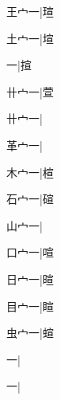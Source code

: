 \begin{multicols}{2}
{{\cjk{}王{宀}一}|{\cjk{}瑄}\par
{\cjk{}土{宀}一}|{\cjk{}塇}\par
{一}|{\cjk{}揎}\par
{\cjk{}卄{宀}一}|{\cjk{}萱}\par
{\cjk{}卄{宀}一}|{}\par
{\cjk{}革{宀}一}|{}\par
{\cjk{}木{宀}一}|{\cjk{}楦}\par
{\cjk{}石{宀}一}|{\cjk{}碹}\par
{\cjk{}山{宀}一}|{}\par
{\cjk{}口{宀}一}|{\cjk{}喧}\par
{\cjk{}日{宀}一}|{\cjk{}暄}\par
{\cjk{}目{宀}一}|{\cjk{}睻}\par
{\cjk{}虫{宀}一}|{\cjk{}蝖}\par
{一}|{}\par
{一}|{}\par
}
\end{multicols}

